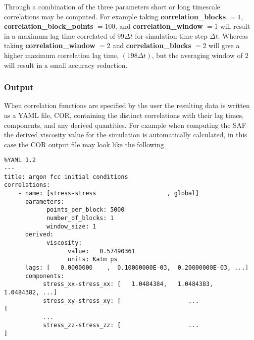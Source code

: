 Through a combination of the three parameters short or long timescale correlations may be computed. For example taking {\bf correlation\_blocks} $= 1$, {\bf correlation\_block\_points} $= 100$, and {\bf correlation\_window} $= 1$ will result in a maximum
lag time correlated of $99 \Delta t$ for simulation time step $\Delta t$. Whereas taking {\bf correlation\_window} $= 2$ and {\bf correlation\_blocks} $= 2$ will give a higher maximum correlation lag time, $(198 \Delta t)$, but the averaging window of $2$ will result in a small accuracy reduction. 

\subsubsection{Output}

When correlation functions are specified by the user the resulting data is written as a YAML file, COR, containing the distinct correlations with their lag times, components, and any derived quantities. For example when computing the SAF the derived viscosity value for the simulation is automatically calculated, in this case the COR output file may look like the following

\begin{verbatim}
%YAML 1.2
---
title: argon fcc initial conditions
correlations:
    - name: [stress-stress                    , global]
      parameters:
            points_per_block: 5000
            number_of_blocks: 1
            window_size: 1
      derived:
            viscosity:
                  value:   0.57490361    
                  units: Katm ps 
      lags: [   0.0000000    ,  0.10000000E-03,  0.20000000E-03, ...]
      components: 
           stress_xx-stress_xx: [   1.0484384,   1.0484383,   1.0484382, ...]
           stress_xy-stress_xy: [                   ...                     ]
           ...
           stress_zz-stress_zz: [                   ...                     ]
\end{verbatim}